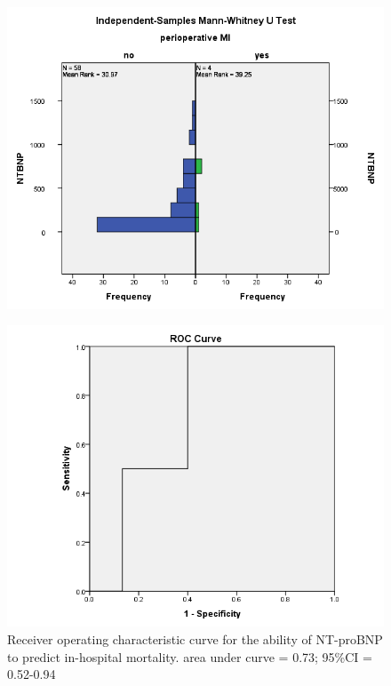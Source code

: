 \documentclass[14pt,a4paper,onecolumn]{extarticle}
\begin{document}
\clearpage
\begin{figure}
    \centering
    \includegraphics[scale=0.7]{../images/manwhit_mi.png}
    \small\caption{}
    \label{}
\end{figure}

\clearpage
\begin{figure}
    \centering
    \includegraphics[scale=0.7]{../images/roc_mort.png}
    \small\caption{Receiver operating characteristic curve for the ability of NT-proBNP to predict in-hospital mortality.  area under curve = 0.73; 95\%CI = 0.52-0.94}
    \label{}
\end{figure}
\end{document}
